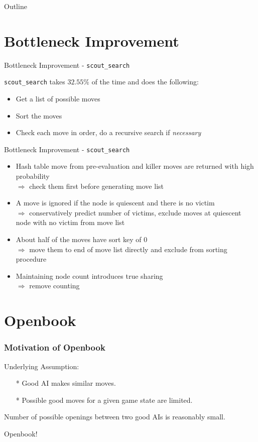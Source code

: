 \documentclass[10pt]{beamer}
\newcommand{\itema}{\item[*]}
\begin{document}
    \begin{frame}{Outline}
    \tableofcontents
    \end{frame}

    \section{Bottleneck Improvement}
    \begin{frame}{Bottleneck Improvement - \tt{scout\_search}}

        {\tt scout\_search} takes $32.55\%$ of the time and does the following:
        \begin{itemize}
            \itema Get a list of possible moves
            \itema Sort the moves
            \itema Check each move in order, do a recursive search if {\it necessary}
        \end{itemize}
    \end{frame}

	\begin{frame}{Bottleneck Improvement - \tt{scout\_search}}
	    \begin{itemize}
	        \itema Hash table move from pre-evaluation and killer moves are returned with high probability \\
	        $\Rightarrow$ check them first before generating move list
	        \itema A move is ignored if the node is quiescent and there is no victim\\
	        $\Rightarrow$ conservatively predict number of victims, exclude moves at quiescent node with no victim from move list
	        \itema About half of the moves have sort key of 0 \\
	        $\Rightarrow$ move them to end of move list directly and exclude from sorting procedure
	        \itema Maintaining node count introduces true sharing \\
	        $\Rightarrow$ remove counting
	    \end{itemize}


	\end{frame}
	\section{Openbook}
		\begin{frame}
		\frametitle{Motivation of Openbook}
		Underlying Assumption:
		\begin{itemize}
		\item[*] Good AI makes similar moves.
		\item[*] Possible good moves for a given game state are limited.
		\end{itemize}
		\pause
		Number of possible openings between two good AIs is reasonably small.

		Openbook!
	\end{frame}
\end{document}
